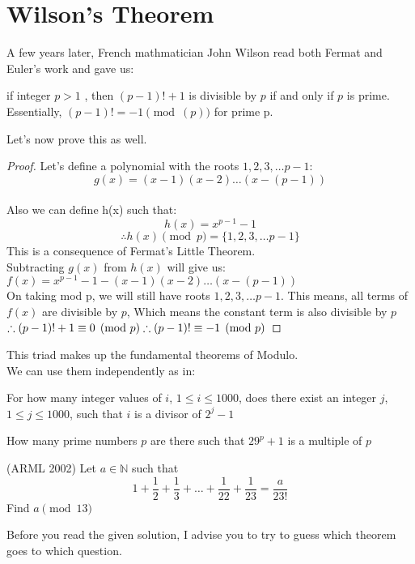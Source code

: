 \section{Wilson's Theorem}
A few years later, French mathmatician John Wilson read both Fermat and Euler's work and gave us:
\begin{theorem}
    if integer $p > 1$ , then $(p-1)! + 1$ is divisible by $p$ if and only if $p$ is prime. Essentially, $(p-1)!=-1 \pmod(p)$ for prime p.
\end{theorem}
Let's now prove this as well.\\
\begin{proof}
Let's define a polynomial with the roots $1,2,3,\dots p-1$:\\
\[g(x)=(x-1)(x-2)\dots(x-(p-1))\]\\
Also we can define h(x) such that:
\[h(x)=x^{p-1}-1\]
\[\therefore h(x)\pmod{p} = \{1,2,3,\dots p-1\}\]
This is a consequence of Fermat's Little Theorem.\\
Subtracting $g(x)$ from $h(x)$ will give us:\\
$f(x)=x^{p-1}-1-(x-1)(x-2)\dots(x-(p-1))$\\
On taking mod p, we will still have roots $1,2,3,\dots p-1$. This means, all terms of $f(x)$ are divisible by $p$, Which means the constant term is also divisible by $p$\\
$\therefore (p-1)!+1 \equiv 0 \pmod{p}\\
\therefore (p-1)! \equiv -1 \pmod{p}$
\end{proof}
This triad makes up the fundamental theorems of Modulo.\\
We can use them independently as in:\\
\begin{example}
     For how many integer values of $i$, $1 \leq i \leq 1000$, does there exist an integer $j$, $1 \leq j \leq 1000$, such that $i$ is a divisor of $2^j - 1$
\end{example}
\begin{example}
     How many prime numbers $p$ are there such that $29^p + 1$ is a multiple of $p$
\end{example}
\begin{example}
(ARML 2002) Let $a \in \mathbb{N}$ such that\\
\[1+\frac{1}{2}+\frac{1}{3}+\dots+\frac{1}{22}+\frac{1}{23}=\frac{a}{23!}\]
Find $a \pmod{13}$
\end{example}
Before you read the given solution, I advise you to try to guess which theorem goes to which question.\\
